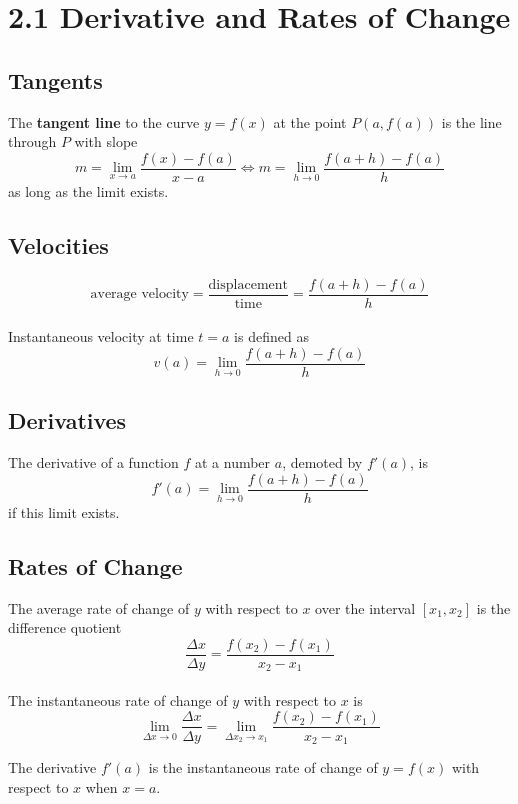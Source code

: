 %
%

\section*{2.1 Derivative and Rates of Change}

\subsection*{Tangents}

The \textbf{tangent line} to the curve \(y=f(x)\) at the point \(P(a, f(a))\) is the line through \(P\) with slope 
$$m=\lim_{x \to a}\frac{f(x)-f(a)}{x-a} \Leftrightarrow m=\lim_{h \to 0}\frac{f(a+h)-f(a)}{h}$$
as long as the limit exists.

\subsection*{Velocities}

$$\text{average velocity}=\frac{\text{displacement}}{\text{time}}=\frac{f(a+h)-f(a)}{h}$$\\
Instantaneous velocity at time \(t = a\) is defined as 
$$v(a) = \lim_{h \to 0}\frac{f(a+h)-f(a)}{h}$$

\subsection*{Derivatives}

The derivative of a function \(f\) at a number \(a\), demoted by \(f'(a)\), is 
$$f'(a)=\lim_{h \to 0}\frac{f(a+h)-f(a)}{h}$$
if this limit exists.

\subsection*{Rates of Change}

The average rate of change of \(y\) with respect to \(x\) over the interval \([x_1, x_2]\) is the difference quotient
$$\frac{\Delta x}{\Delta y}=\frac{f(x_2)-f(x_1)}{x_2-x_1}$$
\\
The instantaneous rate of change of \(y\) with respect to \(x\) is 
$$\lim_{\Delta x \to 0}\frac{\Delta x}{\Delta y}=\lim_{\Delta x_2 \to x_1}\frac{f(x_2)-f(x_1)}{x_2-x_1}$$

The derivative \(f'(a)\) is the instantaneous rate of change of \(y=f(x)\) with respect to \(x\) when \(x=a\).

